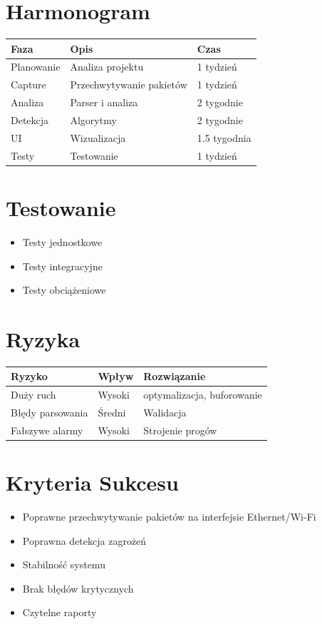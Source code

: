 \documentclass[a4paper,12pt]{article}
\begin{document}
	\section{Harmonogram}
	\begin{longtable}{|l|l|l|}
		\hline
		Faza & Opis & Czas \\
		\hline
		Planowanie & Analiza projektu & 1 tydzień \\
		Capture & Przechwytywanie pakietów & 1 tydzień \\
		Analiza & Parser i analiza & 2 tygodnie \\
		Detekcja & Algorytmy & 2 tygodnie \\
		UI & Wizualizacja & 1.5 tygodnia \\
		Testy & Testowanie & 1 tydzień \\
		\hline
	\end{longtable}
	
	\section{Testowanie}
	\begin{itemize}
		\item Testy jednostkowe
		\item Testy integracyjne
		\item Testy obciążeniowe
	\end{itemize}
	
	\section{Ryzyka}
	\begin{longtable}{|l|l|l|}
		\hline
		Ryzyko & Wpływ & Rozwiązanie \\
		\hline
		Duży ruch & Wysoki & optymalizacja, buforowanie \\
		Błędy parsowania & Średni & Walidacja \\
		Fałszywe alarmy & Wysoki & Strojenie progów \\
		\hline
	\end{longtable}
	
	\section{Kryteria Sukcesu}
	\begin{itemize}
		\item Poprawne przechwytywanie pakietów na interfejsie Ethernet/Wi-Fi
		\item Poprawna detekcja zagrożeń
		\item Stabilność systemu
		\item Brak błędów krytycznych
		\item Czytelne raporty
		
	\end{itemize}
	
\end{document}
